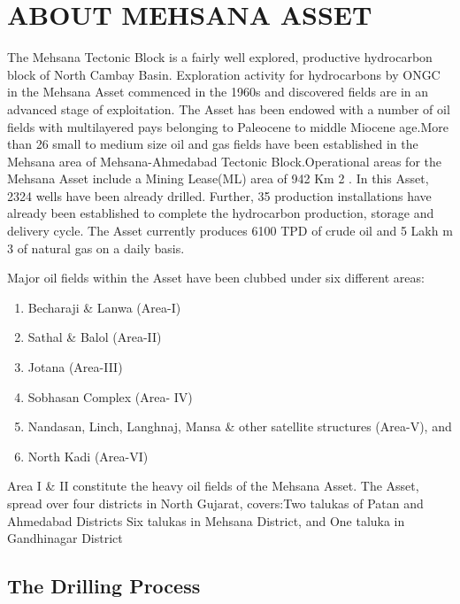 \chapter{ABOUT MEHSANA ASSET}

The Mehsana Tectonic Block is a fairly well explored, productive hydrocarbon block of North Cambay Basin. Exploration activity for hydrocarbons by ONGC in the Mehsana Asset commenced in the 1960s and discovered fields are in an advanced stage of exploitation. The Asset has been endowed with a number of oil fields with multilayered pays belonging to Paleocene to middle Miocene age.More than 26 small to medium size oil and gas fields have been established in the Mehsana area of Mehsana-Ahmedabad Tectonic Block.Operational areas for the Mehsana Asset include a Mining Lease(ML) area of 942 Km 2 . In this Asset, 2324 wells have been already
drilled. Further, 35 production installations have already been established to complete the hydrocarbon production, storage and delivery cycle. The Asset currently produces 6100 TPD of crude oil and 5 Lakh m 3 of natural gas on a daily basis.

\vspace{1em}

\noindent Major oil fields within the Asset have been clubbed under six different areas:

\begin{enumerate}
\item Becharaji \& Lanwa (Area-I)

\item Sathal \& Balol (Area-II)

\item Jotana (Area-III)

\item Sobhasan Complex (Area- IV)

\item Nandasan, Linch, Langhnaj, Mansa \& other satellite structures (Area-V), and

\item North Kadi (Area-VI)

\end{enumerate}

\noindent Area I \& II constitute the heavy oil fields of the Mehsana Asset.
The Asset, spread over four districts in North Gujarat, covers:Two talukas of Patan and Ahmedabad Districts Six talukas in Mehsana District,
and One taluka in Gandhinagar District

\section{The Drilling Process}

